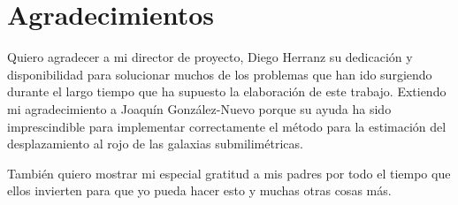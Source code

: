 \section*{Agradecimientos}\label{sec:9_agradecimientos}

Quiero agradecer a mi director de proyecto, Diego Herranz su dedicación y disponibilidad para solucionar muchos de los problemas que han ido surgiendo durante el largo tiempo que ha supuesto la elaboración de este trabajo. Extiendo mi agradecimiento a Joaquín González-Nuevo porque su ayuda ha sido imprescindible para implementar correctamente el método para la estimación del desplazamiento al rojo de las galaxias submilimétricas.

También quiero mostrar mi especial gratitud a mis padres por todo el tiempo que ellos invierten para que yo pueda hacer esto y muchas otras cosas más.